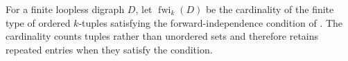\begin{definition}
For a finite loopless digraph $D$, let
$\operatorname{fwi}_k(D)$ be the cardinality of the finite type of ordered
$k$-tuples satisfying the forward-independence condition of
.  The cardinality counts tuples rather than
unordered sets and therefore retains repeated entries when they satisfy the
condition.
\end{definition}
